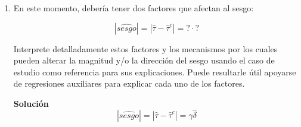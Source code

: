 \documentclass[a4paper, answers, addpoints, 11pt]{exam}
\begin{document}
\begin{enumerate} [resume]
\begin{mdframed}
\begin{proof}
    

Entonces:

\begin{align*}
    \hat{\tau} &= \frac{\operatorname{cov}(\tilde{victim}, \tilde{peace})}{\operatorname{var}(\tilde{victim})} \qquad \text{(Por A1)}\\
    &= \frac{\operatorname{cov}(\tilde{victim}, \hat{\tau}^c \tilde{victim} + \hat{\gamma} \tilde{center})}{\operatorname{var}(\tilde{victim}_i)} \qquad \text{(Usando \ref{aniquilacionx})} \\
     &= \hat{\tau}^c \frac{\operatorname{var}(\tilde{victim})}{\operatorname{var}(\tilde{victim})} + \frac{\operatorname{cov}(\tilde{victim}, \hat{\gamma} \tilde{center})}{\operatorname{var}(\tilde{victim})} \\
    &= \hat{\tau}^c + \hat{\gamma} \left( \frac{\operatorname{cov}(\tilde{victim}, \tilde{center})}{\operatorname{var}(\tilde{victim})} \right) \\
    \intertext{Defina $ \hat{\delta} := \frac{\operatorname{cov}(\tilde{victim}, \tilde{center})}{\operatorname{var}(\tilde{victim})}$ entonces}
    &= \hat{\tau}^c+ \hat{\gamma} \hat{\delta}
\end{align*}
Luego hemos mostrado que $\hat{\tau} =\hat{\tau}^c+ \hat{\gamma} \hat{\delta}$. Por tanto $\hat{\tau}$ tiene un sesgo respecto a $\hat{\tau}^c$  y la magnitud va a depender de la correlación entre ser victima y estar en el centro (descontando ya el efecto de los controles).

    \end{proof}
        \end{mdframed}

    \bigskip\item En este momento, debería tener dos factores que afectan al sesgo:
    
    \begin{equation}\label{eq:ovb}
        |\hat{sesgo}| = |\hat\tau - \hat\tau^c| = \mathord{?} \cdot \mathord{?}
    \end{equation}
    
    Interprete detalladamente estos factores y los mecanismos por los cuales pueden alterar la magnitud y/o la dirección del sesgo usando el caso de estudio como referencia para sus explicaciones. Puede resultarle útil apoyarse de regresiones auxiliares para explicar cada uno de los factores.

    \begin{mdframed}
        \textbf{Solución}
        \begin{equation*} 
        |\hat{sesgo}| = |\hat\tau - \hat\tau^c| = \hat{\gamma} \hat{\delta}
    \end{equation*}
       

        \end{mdframed}
      
        

\end{enumerate}
\end{document}
